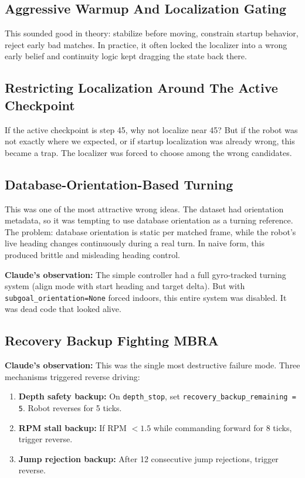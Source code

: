 \documentclass[11pt]{article}
\begin{document}
\subsection{Aggressive Warmup And Localization Gating}

This sounded good in theory: stabilize before moving, constrain startup behavior, reject early bad matches. In practice, it often locked the localizer into a wrong early belief and continuity logic kept dragging the state back there.

\subsection{Restricting Localization Around The Active Checkpoint}

If the active checkpoint is step 45, why not localize near 45? But if the robot was not exactly where we expected, or if startup localization was already wrong, this became a trap. The localizer was forced to choose among the wrong candidates.

\subsection{Database-Orientation-Based Turning}

This was one of the most attractive wrong ideas. The dataset had orientation metadata, so it was tempting to use database orientation as a turning reference. The problem: database orientation is static per matched frame, while the robot's live heading changes continuously during a real turn. In naive form, this produced brittle and misleading heading control.

\textbf{Claude's observation:} The simple controller had a full gyro-tracked turning system (align mode with start heading and target delta). But with \texttt{subgoal\_orientation=None} forced indoors, this entire system was disabled. It was dead code that looked alive.

\subsection{Recovery Backup Fighting MBRA}
\label{sec:oscillation}

\textbf{Claude's observation:} This was the single most destructive failure mode. Three mechanisms triggered reverse driving:
\begin{enumerate}
\item \textbf{Depth safety backup:} On \texttt{depth\_stop}, set \texttt{recovery\_backup\_remaining = 5}. Robot reverses for 5 ticks.
\item \textbf{RPM stall backup:} If RPM $< 1.5$ while commanding forward for 8 ticks, trigger reverse.
\item \textbf{Jump rejection backup:} After 12 consecutive jump rejections, trigger reverse.
\end{enumerate}
\end{document}
